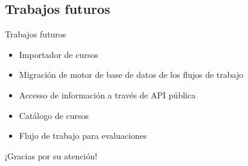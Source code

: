 \documentclass[10pt,xcolor=table ]{beamer}
\begin{document}
\subsection{Trabajos futuros}
\begin{frame}{Trabajos futuros}
	\begin{itemize}[<+- | alert@+>]
	    \item Importador de cursos
	    \item Migración de motor de base de datos de los flujos de trabajo
	    \item Accesso de información a través de API pública
	    \item Catálogo de cursos
	    \item Flujo de trabajo para evaluaciones
	\end{itemize}
\end{frame}


\begin{frame}[standout]
  ¡Gracias por su atención!
\end{frame}
\end{document}
